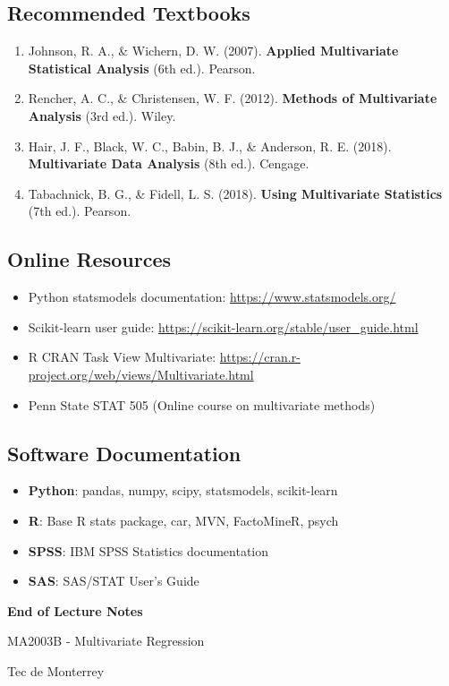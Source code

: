\documentclass[
]{article}
\begin{document}
\textbf{ }

\subsection{Recommended Textbooks}

\begin{enumerate}
\item
  Johnson, R. A., \& Wichern, D. W. (2007). \textbf{Applied Multivariate
  Statistical Analysis} (6th ed.). Pearson.
\item
  Rencher, A. C., \& Christensen, W. F. (2012). \textbf{Methods of
  Multivariate Analysis} (3rd ed.). Wiley.
\item
  Hair, J. F., Black, W. C., Babin, B. J., \& Anderson, R. E. (2018).
  \textbf{Multivariate Data Analysis} (8th ed.). Cengage.
\item
  Tabachnick, B. G., \& Fidell, L. S. (2018). \textbf{Using Multivariate
  Statistics} (7th ed.). Pearson.
\end{enumerate}

\textbf{ }

\subsection{Online Resources}

\begin{itemize}
\item
  Python statsmodels documentation: \url{https://www.statsmodels.org/}
\item
  Scikit-learn user guide:
  \url{https://scikit-learn.org/stable/user_guide.html}
\item
  R CRAN Task View Multivariate:
  \url{https://cran.r-project.org/web/views/Multivariate.html}
\item
  Penn State STAT 505 (Online course on multivariate methods)
\end{itemize}

\textbf{ }

\subsection{Software Documentation}

\begin{itemize}
\item
  \textbf{Python}: pandas, numpy, scipy, statsmodels, scikit-learn
\item
  \textbf{R}: Base R stats package, car, MVN, FactoMineR, psych
\item
  \textbf{SPSS}: IBM SPSS Statistics documentation
\item
  \textbf{SAS}: SAS/STAT User's Guide
\end{itemize}

\textbf{End of Lecture Notes}

MA2003B - Multivariate Regression

Tec de Monterrey
\end{document}
